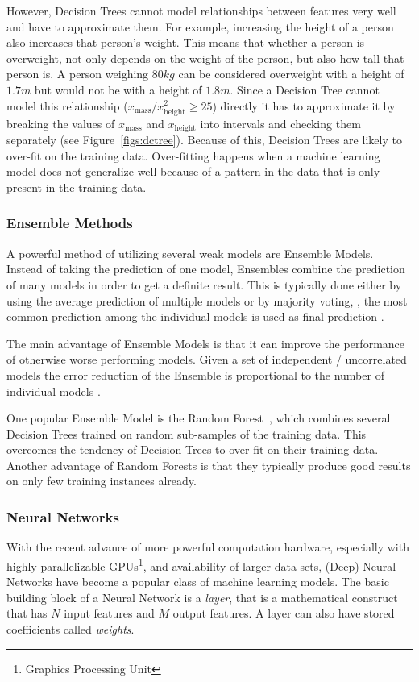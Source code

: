 However, Decision Trees cannot model relationships between features very well and have to approximate them.
For example, increasing the height of a person also increases that person's weight.
This means that whether a person is overweight, not only depends on the weight of the person, but also how tall that person is.
A person weighing $80\si{kg}$ can be considered overweight with a height of $1.7\si{m}$ but would not be with a height of $1.8\si{m}$.
Since a Decision Tree cannot model this relationship ($x_\text{mass} / x_\text{height}^2 \geq 25$) directly it has to approximate it by breaking the values of $x_\text{mass}$ and $x_\text{height}$ into intervals and checking them separately (see Figure~\ref{figs:dctree}).
Because of this, Decision Trees are likely to over-fit on the training data.
Over-fitting happens when a machine learning model does not generalize well because of a pattern in the data that is only present in the training data.

\subsubsection{Ensemble Methods}
A powerful method of utilizing several weak models are Ensemble Models.
Instead of taking the prediction of one model, Ensembles combine the prediction of many models in order to get a definite result.
This is typically done either by using the average prediction of multiple models or by majority voting, \ie, the most common prediction among the individual models is used as final prediction \cite{mlbook}.

The main advantage of Ensemble Models is that it can improve the performance of otherwise worse performing models.
Given a set of independent / uncorrelated models the error reduction of the Ensemble is proportional to the number of individual models \cite{dlbook}. %

One popular Ensemble Model is the Random Forest~\cite{Breiman:2001:RF:570181.570182}, which combines several Decision Trees trained on random sub-samples of the training data.
This overcomes the tendency of Decision Trees to over-fit on their training data.
Another advantage of Random Forests is that they typically produce good results on only few training instances already.

\subsubsection{Neural Networks}
With the recent advance of more powerful computation hardware, especially with highly parallelizable GPUs\footnote{Graphics Processing Unit}, and availability of larger data sets, (Deep) Neural Networks have become a popular class of machine learning models.
The basic building block of a Neural Network is a \emph{layer}, that is a mathematical construct that has $N$ input features and $M$ output features.
A layer can also have stored coefficients called \emph{weights}.

